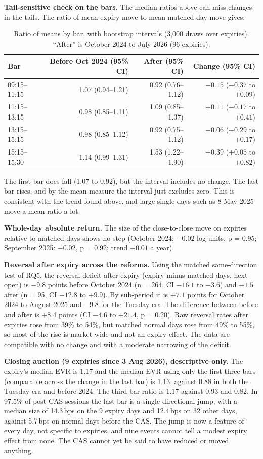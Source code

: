 \documentclass[10pt,a4paper]{article}
\newcommand{\bps}{\,bps\xspace}
\begin{document}
\textbf{Tail-sensitive check on the bars.} The median ratios above can miss changes in the tails. The ratio of mean expiry move to mean matched-day move gives:
\begin{table}[h!]\centering\small
\begin{tabular}{lrrr}
\toprule
Bar & Before Oct 2024 (95\% CI) & After (95\% CI) & Change (95\% CI)\\
\midrule
09:15--11:15 & 1.07 (0.94--1.21) & 0.92 (0.76--1.12) & $-0.15$ ($-0.37$ to $+0.09$)\\
11:15--13:15 & 0.98 (0.85--1.11) & 1.09 (0.85--1.37) & $+0.11$ ($-0.17$ to $+0.41$)\\
13:15--15:15 & 0.98 (0.85--1.12) & 0.92 (0.75--1.12) & $-0.06$ ($-0.29$ to $+0.17$)\\
15:15--15:30 & 1.14 (0.99--1.31) & 1.53 (1.22--1.90) & $+0.39$ ($+0.05$ to $+0.82$)\\
\bottomrule
\end{tabular}
\caption{Ratio of means by bar, with bootstrap intervals (3{,}000 draws over expiries). ``After'' is October 2024 to July 2026 (96 expiries).}
\end{table}
The first bar does fall (1.07 to 0.92), but the interval includes no change. The last bar rises, and by the mean measure the interval just excludes zero. This is consistent with the trend found above, and large single days such as 8 May 2025 move a mean ratio a lot.

\textbf{Whole-day absolute return.} The size of the close-to-close move on expiries relative to matched days shows no step (October 2024: $-0.02$ log units, p = 0.95; September 2025: $-0.02$, p = 0.92; trend $-0.01$ a year).

\textbf{Reversal after expiry across the reforms.} Using the matched same-direction test of RQ5, the reversal deficit after expiry (expiry minus matched days, next open) is $-9.8$ points before October 2024 (n = 264, CI $-16.1$ to $-3.6$) and $-1.5$ after (n = 95, CI $-12.8$ to $+9.9$). By sub-period it is $+7.1$ points for October 2024 to August 2025 and $-9.8$ for the Tuesday era. The difference between before and after is $+8.4$ points (CI $-4.6$ to $+21.4$, p = 0.20). Raw reversal rates after expiries rose from 39\% to 54\%, but matched normal days rose from 49\% to 55\%, so most of the rise is market-wide and not an expiry effect. The data are compatible with no change and with a moderate narrowing of the deficit.

\textbf{Closing auction (9 expiries since 3 Aug 2026), descriptive only.} The expiry's median EVR is 1.17 and the median EVR using only the first three bars (comparable across the change in the last bar) is 1.13, against 0.88 in both the Tuesday era and before 2024. The third bar ratio is 1.17 against 0.93 and 0.82. In 97.5\% of post-CAS sessions the last bar is a single directional jump, with a median size of 14.3\bps on the 9 expiry days and 12.4\bps on 32 other days, against 5.7\bps on normal days before the CAS. The jump is now a feature of every day, not specific to expiries, and nine events cannot tell a modest expiry effect from none. The CAS cannot yet be said to have reduced or moved anything.
\end{document}
